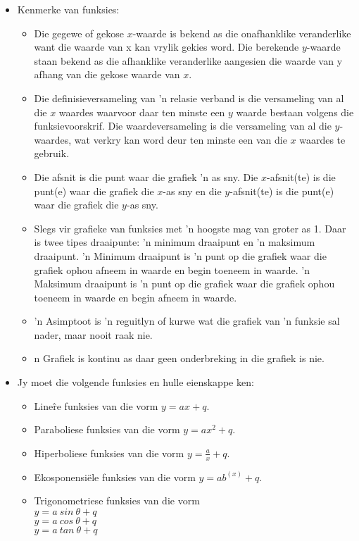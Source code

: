 
\begin{itemize}[noitemsep]
\item Kenmerke van funksies: 
\begin{itemize}[noitemsep]
\item Die gegewe of gekose $x$-waarde is bekend as die onafhanklike veranderlike want die waarde van x kan
vrylik gekies word. Die berekende $y$-waarde staan bekend as die afhanklike veranderlike aangesien
die waarde van y afhang van die gekose waarde van $x$.
\item Die definisieversameling van ’n relasie verband is die versameling van al die $x$ waardes waarvoor daar ten minste een $y$ waarde bestaan volgens die funksievoorskrif. Die waardeversameling is die versameling van al die $y$-waardes, wat verkry kan word deur ten minste een van die $x$ waardes te gebruik.
\item Die afsnit is die punt waar die grafiek ’n as sny. Die $x$-afsnit(te) is die punt(e) waar die grafiek die $x$-as
sny en die $y$-afsnit(te) is die punt(e) waar die grafiek die $y$-as sny. 
\item Slegs vir grafieke van funksies met ’n hoogste mag van groter as 1. Daar is twee tipes draaipunte: ’n
minimum draaipunt en ’n maksimum draaipunt. ’n Minimum draaipunt is ’n punt op die grafiek waar
die grafiek ophou afneem in waarde en begin toeneem in waarde. ’n Maksimum draaipunt is ’n punt
op die grafiek waar die grafiek ophou toeneem in waarde en begin afneem in waarde. 
\item ’n Asimptoot is ’n reguitlyn of kurwe wat die grafiek van ’n funksie sal nader, maar nooit raak nie.
\item n Grafiek is kontinu as daar geen onderbreking in die grafiek is nie. 
\end{itemize}
\item  Jy moet die volgende funksies en hulle eienskappe ken:
    \begin{itemize}[noitemsep]
    \item Line\^re funksies van die vorm $y=ax+q$. 
    \item Paraboliese funksies van die vorm $y=a{x}^{2}+q$.
    \item Hiperboliese funksies van die vorm $y=\frac{a}{x}+q$. 
    \item Ekosponensi\"ele funksies van die vorm $y=a{b}^{(x)}+q$. 
    \item Trigonometriese funksies van die vorm 
	  \\$y=a~sin~\theta+q$ \\$y=a~cos~\theta+q$\\ $y=a~tan~\theta+q$ 
    \end{itemize}
\end{itemize}

